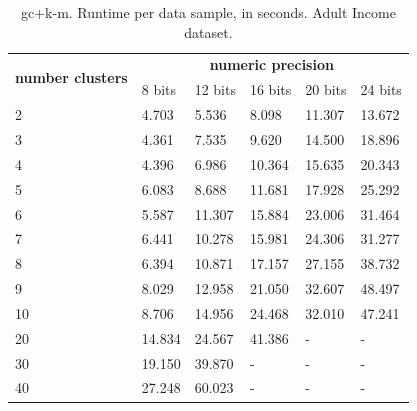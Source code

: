 \begin{table}[htp]
\centering
\caption{\acs{gc}+\acs{k-m}. Runtime per data sample, in seconds. Adult Income dataset.}
\label{table:runtimeKMAI}
\begin{tabular}{|l|l|l|l|l|l|}
\hline
\multirow{2}{*}{\textbf{number clusters}} & \multicolumn{5}{c|}{\textbf{numeric precision}}                                              \\ \cline{2-6}
                                          & 8 bits & 12 bits & 16 bits & 20 bits & 24 bits \\ \hline
2                                & 4.703           & 5.536            & 8.098            & 11.307           & 13.672           \\ \hline
3                                & 4.361           & 7.535            & 9.620            & 14.500           & 18.896           \\ \hline
4                                & 4.396           & 6.986            & 10.364           & 15.635           & 20.343           \\ \hline
5                                & 6.083           & 8.688            & 11.681           & 17.928           & 25.292           \\ \hline
6                                & 5.587           & 11.307           & 15.884           & 23.006           & 31.464           \\ \hline
7                                & 6.441           & 10.278           & 15.981           & 24.306           & 31.277           \\ \hline
8                                & 6.394           & 10.871           & 17.157           & 27.155           & 38.732           \\ \hline
9                                & 8.029           & 12.958           & 21.050           & 32.607           & 48.497           \\ \hline
10                               & 8.706           & 14.956           & 24.468           & 32.010           & 47.241           \\ \hline
20                               & 14.834          & 24.567           & 41.386           & -                & -                \\ \hline
30                               & 19.150          & 39.870           & -                & -                & -                \\ \hline
40                               & 27.248          & 60.023           & -                & -                & -                \\ \hline

\end{tabular}
\end{table}
